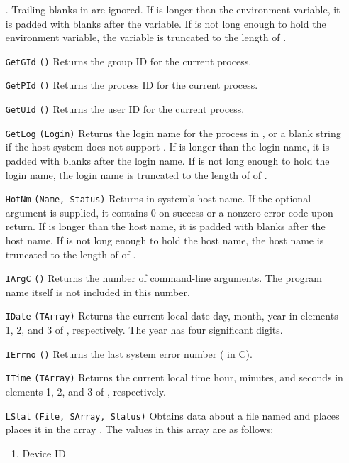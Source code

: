 \begin{itemize}
    . Trailing blanks in  are ignored.
    If  is longer than the environment variable, it is padded
    with blanks after the variable.  If  is not long enough to
    hold the environment variable, the variable is truncated to the length
    of .
  \item[\tt GetGId]{\tt ()}
    Returns the group ID for the current process.
  \item[\tt GetPId]{\tt ()}
    Returns the process ID for the current process.
  \item[\tt GetUId]{\tt ()}
    Returns the user ID for the current process.
  \item[\tt GetLog]{\tt (Login)}
    Returns the login name for the process in , or a blank
    string if the host system does not support .
    If  is longer than the login name, it is padded
    with blanks after the login name.  If  is not long enough
    to hold the login name, the login name is truncated to the length of
    of .
  \item[\tt HotNm]{\tt (Name, Status)}
    Returns in  system's host name. If the optional 
    argument is supplied, it contains 0 on success or a nonzero error code
    upon return.
    If  is longer than the host name, it is padded
    with blanks after the host name.  If  is not long enough
    to hold the host name, the host name is truncated to the length of
    of .
  \item[\tt IArgC]{\tt ()}
    Returns the number of command-line arguments.  The program name
    itself is not included in this number.
  \item[\tt IDate]{\tt (TArray)}
    Returns the current local date day, month, year in
    elements 1, 2, and 3 of , respectively.
    The year has four significant digits. 
  \item[\tt IErrno]{\tt ()}
    Returns the last system error number ( in C).
  \item[\tt ITime]{\tt (TArray)}
    Returns the current local time hour, minutes, and seconds in
    elements 1, 2, and 3 of , respectively.
  \item[\tt LStat]{\tt (File, SArray, Status)}
    Obtains data about a file named  and places places it in
    the array . The values in this array are as follows:
    \begin{enumerate}
      \item Device ID 

\end{enumerate}
\end{itemize}
